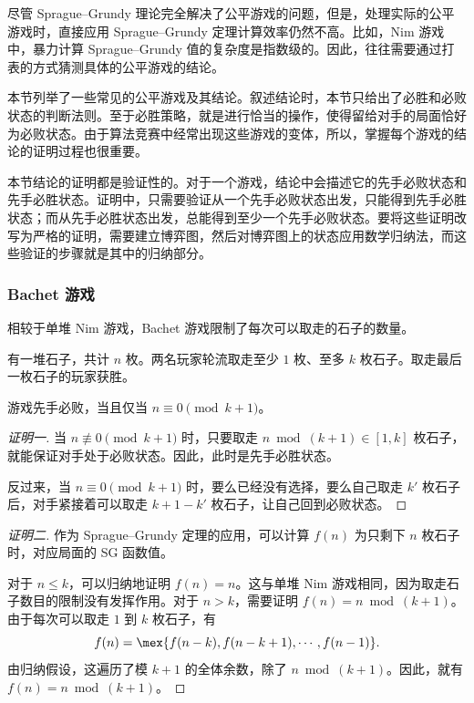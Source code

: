 尽管 Sprague--Grundy 理论完全解决了公平游戏的问题，但是，处理实际的公平游戏时，直接应用 Sprague--Grundy 定理计算效率仍然不高。比如，Nim 游戏中，暴力计算 Sprague--Grundy 值的复杂度是指数级的。因此，往往需要通过打表的方式猜测具体的公平游戏的结论。

本节列举了一些常见的公平游戏及其结论。叙述结论时，本节只给出了必胜和必败状态的判断法则。至于必胜策略，就是进行恰当的操作，使得留给对手的局面恰好为必败状态。由于算法竞赛中经常出现这些游戏的变体，所以，掌握每个游戏的结论的证明过程也很重要。

本节结论的证明都是验证性的。对于一个游戏，结论中会描述它的先手必败状态和先手必胜状态。证明中，只需要验证从一个先手必败状态出发，只能得到先手必胜状态；而从先手必胜状态出发，总能得到至少一个先手必败状态。要将这些证明改写为严格的证明，需要建立博弈图，然后对博弈图上的状态应用数学归纳法，而这些验证的步骤就是其中的归纳部分。

\newpage

\subsubsection{Bachet 游戏}

相较于单堆 Nim 游戏，Bachet 游戏限制了每次可以取走的石子的数量。

\begin{game}[Bachet]
	有一堆石子，共计 $n$ 枚。两名玩家轮流取走至少 $1$ 枚、至多 $k$ 枚石子。取走最后一枚石子的玩家获胜。
\end{game}

\begin{theorem}
	游戏先手必败，当且仅当 $n\equiv 0\pmod {k+1}$。
\end{theorem}

\begin{proof}[证明一]
	当 $n\not\equiv 0\pmod {k+1}$ 时，只要取走 $n\bmod{(k+1)}\in[1,k]$ 枚石子，就能保证对手处于必败状态。因此，此时是先手必胜状态。
	
	反过来，当 $n\equiv 0\pmod {k+1}$ 时，要么已经没有选择，要么自己取走 $k'$ 枚石子后，对手紧接着可以取走 $k+1-k'$ 枚石子，让自己回到必败状态。
\end{proof}

\begin{proof}[证明二]
	作为 Sprague--Grundy 定理的应用，可以计算 $f(n)$ 为只剩下 $n$ 枚石子时，对应局面的 SG 函数值。
	
	对于 $n\le k$，可以归纳地证明 $f(n)=n$。这与单堆 Nim 游戏相同，因为取走石子数目的限制没有发挥作用。对于 $n>k$，需要证明 $f(n)=n\bmod{(k+1)}$。由于每次可以取走 $1$ 到 $k$ 枚石子，有
	$$
	f(n) = \mex\{f(n-k),f(n-k+1),\cdots,f(n-1)\}.
	$$
	由归纳假设，这遍历了模 $k+1$ 的全体余数，除了 $n\bmod{(k+1)}$。因此，就有 $f(n) = n\bmod{(k+1)}$。
\end{proof}

